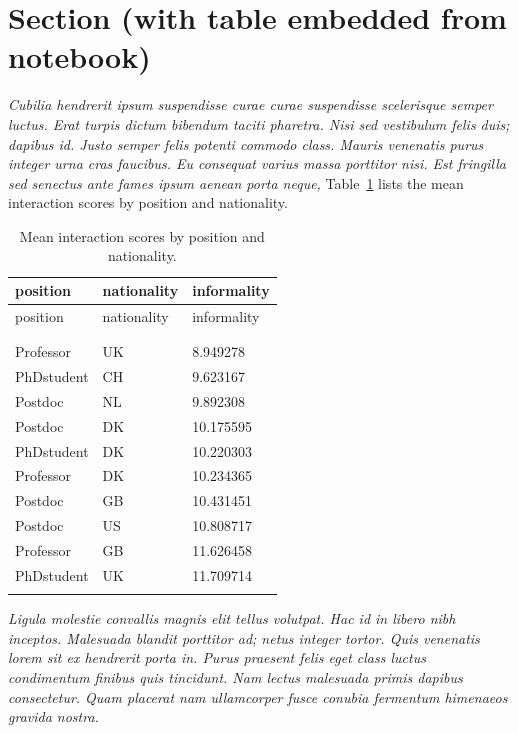 \documentclass[
  a4paper,
]{scrbook}
\let\oldemph\emph
\renewcommand\emph[1]{\oldemph{\color{gray}#1}}
\begin{document}
\section{Section (with table embedded from
notebook)}\label{section-with-table-embedded-from-notebook}

\emph{Cubilia hendrerit ipsum suspendisse curae curae suspendisse
scelerisque semper luctus. Erat turpis dictum bibendum taciti pharetra.
Nisi sed vestibulum felis duis; dapibus id. Justo semper felis potenti
commodo class. Mauris venenatis purus integer urna cras faucibus. Eu
consequat varius massa porttitor nisi. Est fringilla sed senectus ante
fames ipsum aenean porta neque,} Table~\ref{tbl-meaninformality} lists
the mean interaction scores by position and nationality.

\begin{longtable}[]{@{}lll@{}}

\toprule\noalign{}
position & nationality & informality \\
\midrule\noalign{}
\endfirsthead
\toprule\noalign{}
position & nationality & informality \\
\midrule\noalign{}
\endhead
\bottomrule\noalign{}
\tabularnewline
\caption{}\label{T_fca36}\tabularnewline
\endlastfoot
Professor & UK & 8.949278 \\
PhDstudent & CH & 9.623167 \\
Postdoc & NL & 9.892308 \\
Postdoc & DK & 10.175595 \\
PhDstudent & DK & 10.220303 \\
Professor & DK & 10.234365 \\
Postdoc & GB & 10.431451 \\
Postdoc & US & 10.808717 \\
Professor & GB & 11.626458 \\
PhDstudent & UK & 11.709714 \\


\caption{\label{tbl-meaninformality}Mean interaction scores by position
and nationality.}

\tabularnewline
\end{longtable}

\emph{Ligula molestie convallis magnis elit tellus volutpat. Hac id in
libero nibh inceptos. Malesuada blandit porttitor ad; netus integer
tortor. Quis venenatis lorem sit ex hendrerit porta in. Purus praesent
felis eget class luctus condimentum finibus quis tincidunt. Nam lectus
malesuada primis dapibus consectetur. Quam placerat nam ullamcorper
fusce conubia fermentum himenaeos gravida nostra.}
\end{document}
